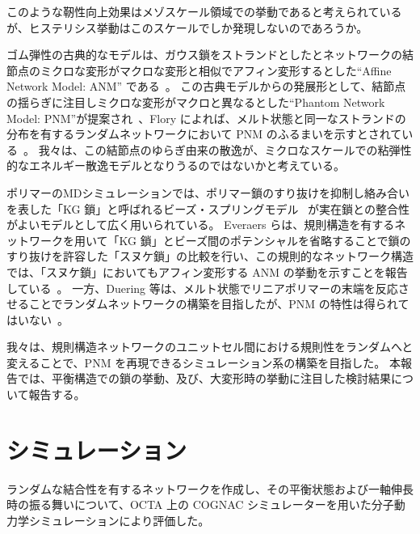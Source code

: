 \documentclass[uplatex,10pt,a4paper,twocolumn]{jsarticle}
\begin{document}
このような靭性向上効果はメゾスケール領域での挙動であると考えられているが、ヒステリシス挙動はこのスケールでしか発現しないのであろうか。

ゴム弾性の古典的なモデルは、ガウス鎖をストランドとしたとネットワークの結節点のミクロな変形がマクロな変形と相似でアフィン変形するとした``Affine Network Model: ANM'' である~\cite{Flory1953}。
この古典モデルからの発展形として、結節点の揺らぎに注目しミクロな変形がマクロと異なるとした``Phantom Network Model: PNM''が提案され~\cite{James1943}、Flory によれば、メルト状態と同一なストランドの分布を有するランダムネットワークにおいて PNM のふるまいを示すとされている~\cite{Flory1976}。
我々は、この結節点のゆらぎ由来の散逸が、ミクロなスケールでの粘弾性的なエネルギー散逸モデルとなりうるのではないかと考えている。

ポリマーのMDシミュレーションでは、ポリマー鎖のすり抜けを抑制し絡み合いを表した「KG 鎖」と呼ばれるビーズ・スプリングモデル~\cite{Kremer1990} が実在鎖との整合性がよいモデルとして広く用いられている。
Everaers らは、規則構造を有するネットワークを用いて「KG 鎖」とビーズ間のポテンシャルを省略することで鎖のすり抜けを許容した「スヌケ鎖」の比較を行い、この規則的なネットワーク構造では、「スヌケ鎖」においてもアフィン変形する ANM の挙動を示すことを報告している~\cite{Everaers1999}。
一方、Duering 等は、メルト状態でリニアポリマーの末端を反応させることでランダムネットワークの構築を目指したが、PNM の特性は得られてはいない~\cite{Duering1994}。

我々は、規則構造ネットワークのユニットセル間における規則性をランダムへと変えることで、PNM を再現できるシミュレーション系の構築を目指した。
本報告では、平衡構造での鎖の挙動、及び、大変形時の挙動に注目した検討結果について報告する。

\section{シミュレーション}
\vspace{-2mm}

ランダムな結合性を有するネットワークを作成し、その平衡状態および一軸伸長時の振る舞いについて、OCTA 上の COGNAC シミュレーターを用いた分子動力学シミュレーションにより評価した。
\end{document}
